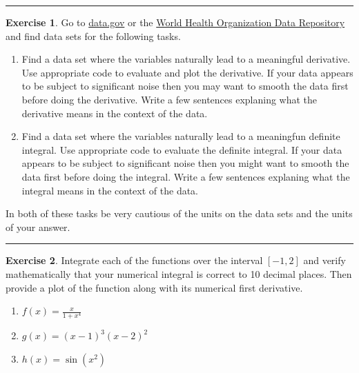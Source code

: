 \documentclass[
]{book}
\theoremstyle{definition}
\theoremstyle{definition}
\theoremstyle{definition}
\newtheorem{exercise}{Exercise}[chapter]
\theoremstyle{remark}
\begin{document}
\begin{center}\rule{0.5\linewidth}{0.5pt}\end{center}

\begin{exercise}
\protect\hypertarget{exr:unnamed-chunk-265}{}{\label{exr:unnamed-chunk-265} }Go to \href{https://www.data.gov/}{data.gov} or the \href{http://apps.who.int/gho/data/?theme=home}{World Health
Organization Data Repository}
and find data sets for the following tasks.

\begin{enumerate}
\def\labelenumi{\alph{enumi}.}
\item
  Find a data set where the variables naturally lead to a meaningful
  derivative. Use appropriate code to evaluate and plot the
  derivative. If your data appears to be subject to significant noise
  then you may want to smooth the data first before doing the derivative. Write a few sentences explaning what the
  derivative means in the context of the data.
\item
  Find a data set where the variables naturally lead to a meaningfun
  definite integral. Use appropriate code to evaluate the definite integral.
  If your data appears to be subject to significant noise then you might want to smooth the data first before doing the
  integral. Write a few sentences explaning what the integral means in
  the context of the data.
\end{enumerate}

In both of these tasks be very cautious of the units on the data sets
and the units of your answer.
\end{exercise}

\begin{center}\rule{0.5\linewidth}{0.5pt}\end{center}

\begin{exercise}
\protect\hypertarget{exr:unnamed-chunk-266}{}{\label{exr:unnamed-chunk-266} }Integrate each of the functions over the interval \([-1,2]\) and verify
mathematically that your numerical integral is correct to 10 decimal
places. Then provide a plot of the function along with its numerical
first derivative.

\begin{enumerate}
\def\labelenumi{\alph{enumi}.}
\item
  \(f(x) = \frac{x}{1+x^4}\)
\item
  \(g(x) = (x-1)^3 (x-2)^2\)
\item
  \(h(x) = \sin\left(x^2\right)\)
\end{enumerate}
\end{exercise}
\end{document}

